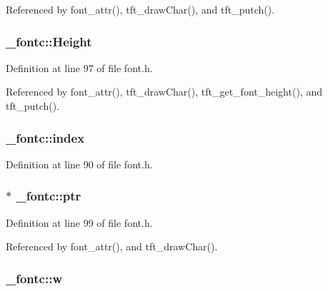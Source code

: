Referenced by font\-\_\-attr(), tft\-\_\-draw\-Char(), and tft\-\_\-putch().

\hypertarget{struct__fontc_a98f97c237dfb1027c38813a17ef6dcd6}{
\subsubsection[{Height}]{ \-\_\-fontc\-::\-Height}}\label{struct__fontc_a98f97c237dfb1027c38813a17ef6dcd6}


Definition at line 97 of file font.\-h.



Referenced by font\-\_\-attr(), tft\-\_\-draw\-Char(), tft\-\_\-get\-\_\-font\-\_\-height(), and tft\-\_\-putch().

\hypertarget{struct__fontc_a7cc0370744ff7ea964054d36917c9a2f}{
\subsubsection[{index}]{ \-\_\-fontc\-::index}}\label{struct__fontc_a7cc0370744ff7ea964054d36917c9a2f}


Definition at line 90 of file font.\-h.

\hypertarget{struct__fontc_a60a3fef5ccd80dff543aac3f22f74876}{
\subsubsection[{ptr}]{ $\ast$ \-\_\-fontc\-::ptr}}\label{struct__fontc_a60a3fef5ccd80dff543aac3f22f74876}


Definition at line 99 of file font.\-h.



Referenced by font\-\_\-attr(), and tft\-\_\-draw\-Char().

\hypertarget{struct__fontc_a9c2af0354d2b2009e7b6684e25fd479b}{
\subsubsection[{w}]{ \-\_\-fontc\-::w}}\label{struct__fontc_a9c2af0354d2b2009e7b6684e25fd479b}


